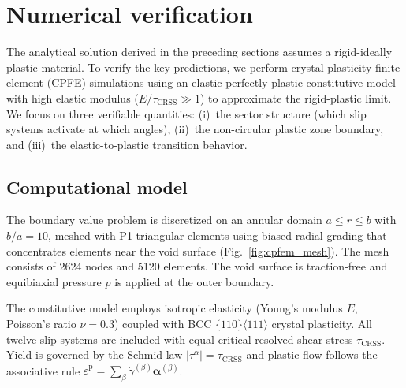 \documentclass{svjour3} %
\newcommand{\tcrss}{\tau_{\mathrm{CRSS}}}
\begin{document}
\section{Numerical verification}
\label{sec:numerical}

The analytical solution derived in the preceding sections assumes a
rigid-ideally plastic material. To verify the key predictions, we perform
crystal plasticity finite element (CPFE) simulations using an
elastic-perfectly plastic constitutive model with high elastic modulus
($E/\tcrss \gg 1$) to approximate the rigid-plastic limit. We focus on
three verifiable quantities: (i)~the sector structure (which slip systems
activate at which angles), (ii)~the non-circular plastic zone boundary,
and (iii)~the elastic-to-plastic transition behavior.

\subsection{Computational model}

The boundary value problem is discretized on an annular domain
$a \leq r \leq b$ with $b/a = 10$, meshed with P1 triangular elements
using biased radial grading that concentrates elements near the void
surface (Fig.~\ref{fig:cpfem_mesh}). The mesh consists of 2624 nodes
and 5120 elements. The void surface is traction-free and equibiaxial
pressure $p$ is applied at the outer boundary.

The constitutive model employs isotropic elasticity (Young's modulus $E$,
Poisson's ratio $\nu = 0.3$) coupled with BCC $\{110\}\langle 111\rangle$
crystal plasticity. All twelve slip systems are included with equal
critical resolved shear stress $\tcrss$.  Yield is governed by the
Schmid law $|\tau^\alpha| = \tcrss$ and plastic flow follows the
associative rule $\dot{\varepsilon}^{\mathrm{p}} = \sum_\beta
\dot{\gamma}^{(\beta)} \boldsymbol{\alpha}^{(\beta)}$.
\end{document}
